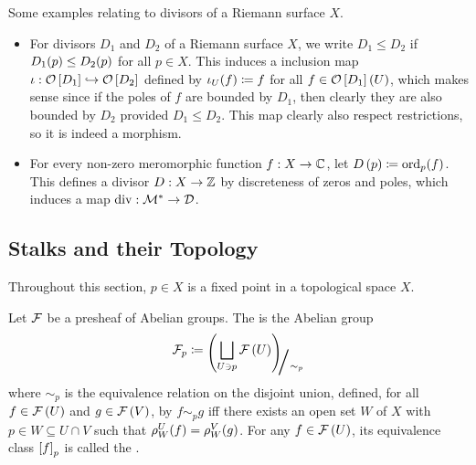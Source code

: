 \documentclass[../Moduli_Spaces_of_Riemann_Surfaces.tex]{subfiles}
\begin{document}
    \begin{example}
        Some examples relating to divisors of a Riemann surface $X$.
        \begin{itemize}
            \item For divisors $D_1$ and $D_2$ of a Riemann surface $X$, we write $D_1\leq D_2$ if $D_1\!\left(p\right)\leq D_2\!\left(p\right)$ for all $p\in X$. This induces a inclusion map $\iota:\mathcal{O}\left[D_1\right]\hookrightarrow\mathcal{O}\left[D_2\right]$ defined by $\iota_U\!\left(f\right)\coloneqq f$ for all $f\in\mathcal{O}\left[D_1\right]\left(U\right)$, which makes sense since if the poles of $f$ are bounded by $D_1$, then clearly they are also bounded by $D_2$ provided $D_1\leq D_2$. This map clearly also respect restrictions, so it is indeed a morphism.
            \item For every non-zero meromorphic function $f:X\to\mathbb{C}$, let $D\left(p\right)\coloneqq\operatorname{ord}_p\!\left(f\right)$. This defines a divisor $D:X\to\mathbb{Z}$ by discreteness of zeros and poles, which induces a map $\operatorname{div}:\mathcal{M}^\ast\to\mathcal{D}$.
        \end{itemize}
    \end{example}
    \subsection{Stalks and their Topology}
    Throughout this section, $p\in X$ is a fixed point in a topological space $X$.
    \begin{definition}
        Let $\mathcal{F}$ be a presheaf of Abelian groups. The  is the Abelian group
        \begin{equation*}
            \mc{F}_p\coloneqq\raisebox{-2pt}{$\Biggl(\!$}\bigsqcup_{U\ni p}\mc{F}\l(U\r)\!\raisebox{-2pt}{$\Biggr)$}\!\!_{\scalebox{2}{/}\sim_p}
        \end{equation*}
        where $\sim_p$ is the equivalence relation on the disjoint union, defined, for all $f\in\mathcal{F}\left(U\right)$ and $g\in\mathcal{F}\left(V\right)$, by $f\sim_p g$ iff there exists an open set $W$ of $X$ with $p\in W\subseteq U\cap V$ such that $\rho^U_W\!\left(f\right)=\rho^V_W\!\left(g\right)$. For any $f\in\mathcal{F}\left(U\right)$, its equivalence class $\left[f\right]_p$ is called the .
    \end{definition}
    \begin{example}
        
    \end{example}
\end{document}

